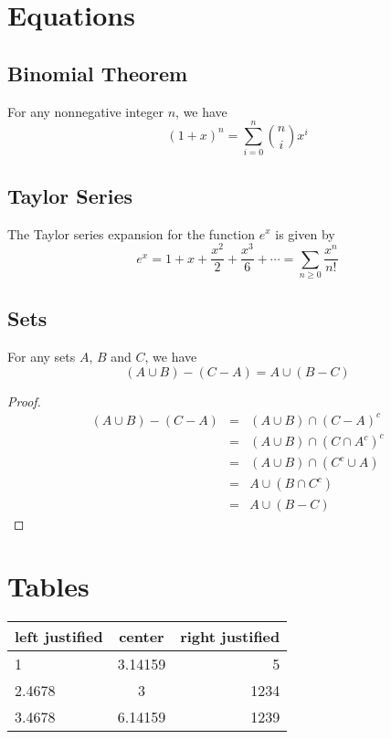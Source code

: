 \section{Equations}

\subsection{Binomial Theorem}
\begin{theorem}
For any nonnegative integer $n$, we have
$$(1+x)^n = \sum_{i=0}^n {n \choose i} x^i$$
\end{theorem}

\subsection{Taylor Series}
The Taylor series expansion for the function $e^x$ is given by
\begin{equation}
e^x = 1 + x + \frac{x^2}{2} + \frac{x^3}{6} + \cdots = \sum_{n\geq 0} \frac{x^n}{n!}
\end{equation}


\subsection{Sets}

\begin{theorem}
For any sets $A$, $B$ and $C$, we have
$$ (A\cup B)-(C-A) = A \cup (B-C)$$
\end{theorem}

\begin{proof}
\begin{eqnarray*}
(A\cup B)-(C-A) &=& (A\cup B) \cap (C-A)^c\\
&=& (A\cup B) \cap (C \cap A^c)^c \\
&=& (A\cup B) \cap (C^c \cup A) \\
&=& A \cup (B\cap C^c) \\
&=& A \cup (B-C)
\end{eqnarray*}
\end{proof}


\section{Tables}
\begin{center}
\begin{tabular}{l||c|r}
left justified & center & right justified \\ \hline
1 & 3.14159 & 5 \\
2.4678 & 3 &  1234 \\ \hline \hline
3.4678 & 6.14159 & 1239
\end{tabular}
\end{center}


